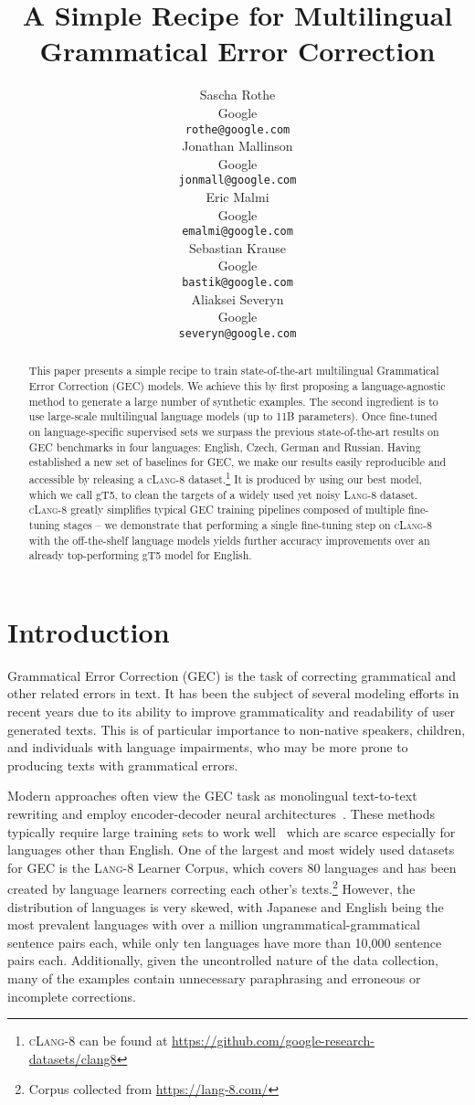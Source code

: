 \documentclass[11pt,a4paper]{article}
\title{A Simple Recipe for Multilingual Grammatical Error Correction}
\author{Sascha Rothe \\
  Google \\
  \texttt{rothe@google.com} \\\And
  Jonathan Mallinson \\
  Google \\
  \texttt{jonmall@google.com} \\\And
  Eric Malmi \\
  Google \\
  \texttt{emalmi@google.com} \\\AND
  Sebastian Krause \\
  Google \\
  \texttt{bastik@google.com} \\\And
  Aliaksei Severyn \\
  Google \\
  \texttt{severyn@google.com} \\}
\date{}
\newcommand{\GT}[0]{{gT5}\xspace}
\newcommand{\lang}[0]{{\scshape Lang-8}\xspace}
\newcommand{\clangg}[0]{{\scshape cLang-8}\xspace}
\begin{document}
\maketitle
\begin{abstract}
This paper presents a simple recipe to train state-of-the-art multilingual Grammatical Error Correction (GEC) models. We achieve this by first proposing a language-agnostic method to generate a large number of synthetic examples. The second ingredient is to use large-scale multilingual language models (up to 11B parameters). Once fine-tuned on language-specific supervised sets we surpass the previous state-of-the-art results on  GEC benchmarks in four languages: English, Czech, German and Russian. Having established a new set of baselines for GEC, we make our results easily reproducible and accessible by releasing a \clangg dataset.\footnote{\clangg can be found at \url{https://github.com/google-research-datasets/clang8}} It is produced by using our best model, which we call \GT, to clean the targets of a widely used yet noisy \lang dataset. \clangg greatly simplifies typical  GEC training pipelines composed of multiple fine-tuning stages -- we demonstrate that performing a single fine-tuning step on \clangg with the off-the-shelf language models  yields further accuracy improvements over an already top-performing \GT model for English. 
\end{abstract}

\section{Introduction}

Grammatical Error Correction (GEC) is the task of correcting grammatical and other related errors in text.
It has been the subject of several modeling efforts in recent years due to its ability to improve grammaticality and readability of user generated texts.
This is of particular importance to non-native speakers, children, and individuals with language impairments, who may be more prone to producing texts with grammatical errors.

Modern approaches often view the GEC task as monolingual text-to-text rewriting \cite{naplava,katsumata2020stronger,grundkiewicz-etal-2019-neural} and employ encoder-decoder neural architectures~\cite{sutskever2014sequence,bahdanau2014neural}.
These methods typically require large training sets to work well~\cite{malmi-etal-2019-encode} which are scarce especially for languages other than English.
One of the largest and most widely used datasets for GEC is the \lang Learner Corpus, which covers 80 languages and has been created by language learners correcting each other's texts.\footnote{Corpus collected from \url{https://lang-8.com/}}
However, the distribution of languages is very skewed, with Japanese and English being the most prevalent languages with over a million ungrammatical-grammatical sentence pairs each, while only ten languages have more than 10,000 sentence pairs each.
Additionally, given the uncontrolled nature of the data collection, many of the examples contain unnecessary paraphrasing and erroneous or incomplete corrections. 
\end{document}
